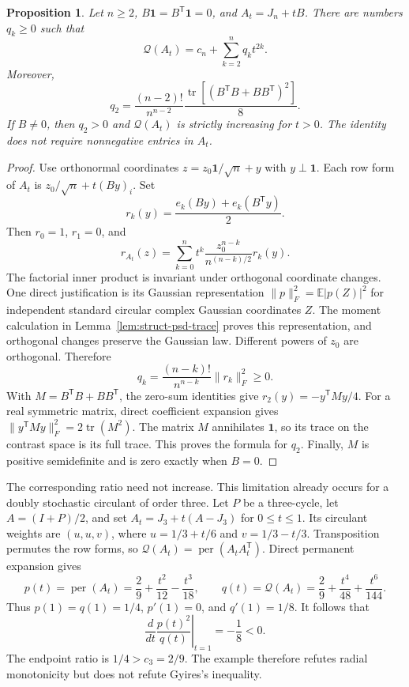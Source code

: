 \documentclass[11pt,a4paper]{article}
\newtheorem{proposition}[theorem]{Proposition}
\theoremstyle{definition}
\theoremstyle{remark}
\newcommand{\per}{\operatorname{per}}
\newcommand{\T}{\mathsf{T}}
\begin{document}
\begin{proposition}\label{prop:struct-radial}
Let $n\ge2$, $B\mathbf1=B^\T\mathbf1=0$, and $A_t=J_n+tB$.
There are numbers $q_k\ge0$ such that
\[
 \mathcal Q(A_t)=c_n+\sum_{k=2}^nq_kt^{2k}.
\]
Moreover,
\[
 q_2=\frac{(n-2)!}{n^{n-2}}
 \frac{\operatorname{tr}[(B^\T B+BB^\T)^2]}8.
\]
If $B\ne0$, then $q_2>0$ and $\mathcal Q(A_t)$ is strictly increasing for $t>0$.
The identity does not require nonnegative entries in $A_t$.
\end{proposition}

\begin{proof}
Use orthonormal coordinates $z=z_0\mathbf1/\sqrt n+y$ with $y\perp\mathbf1$.
Each row form of $A_t$ is $z_0/\sqrt n+t(By)_i$.
Set
\[
 r_k(y)=\frac{e_k(By)+e_k(B^\T y)}2.
\]
Then $r_0=1$, $r_1=0$, and
\[
 r_{A_t}(z)=\sum_{k=0}^n
 t^k\frac{z_0^{n-k}}{n^{(n-k)/2}}r_k(y).
\]
The factorial inner product is invariant under orthogonal coordinate changes.
One direct justification is its Gaussian representation
$\|p\|_F^2=\mathbb E|p(Z)|^2$ for independent standard circular complex Gaussian coordinates $Z$.
The moment calculation in Lemma~\ref{lem:struct-psd-trace} proves this representation, and orthogonal changes preserve the Gaussian law.
Different powers of $z_0$ are orthogonal.
Therefore
\[
 q_k=\frac{(n-k)!}{n^{n-k}}\|r_k\|_F^2\ge0.
\]
With $M=B^\T B+BB^\T$, the zero-sum identities give
$r_2(y)=-y^\T M y/4$.
For a real symmetric matrix, direct coefficient expansion gives
$\|y^\T M y\|_F^2=2\operatorname{tr}(M^2)$.
The matrix $M$ annihilates $\mathbf1$, so its trace on the contrast space is its full trace.
This proves the formula for $q_2$.
Finally, $M$ is positive semidefinite and is zero exactly when $B=0$.
\end{proof}

The corresponding ratio need not increase.
This limitation already occurs for a doubly stochastic circulant of order three.
Let $P$ be a three-cycle, let $A=(I+P)/2$, and set $A_t=J_3+t(A-J_3)$ for $0\le t\le1$.
Its circulant weights are $(u,u,v)$, where $u=1/3+t/6$ and $v=1/3-t/3$.
Transposition permutes the row forms, so $\mathcal Q(A_t)=\per(A_tA_t^\T)$.
Direct permanent expansion gives
\[
 p(t)=\per(A_t)=\frac29+\frac{t^2}{12}-\frac{t^3}{18},
 \qquad
 q(t)=\mathcal Q(A_t)=\frac29+\frac{t^4}{48}+\frac{t^6}{144}.
\]
Thus $p(1)=q(1)=1/4$, $p'(1)=0$, and $q'(1)=1/8$.
It follows that
\[
 \left.\frac{d}{dt}\frac{p(t)^2}{q(t)}\right|_{t=1}=-\frac18<0.
\]
The endpoint ratio is $1/4>c_3=2/9$.
The example therefore refutes radial monotonicity but does not refute Gyires's inequality.
\end{document}
